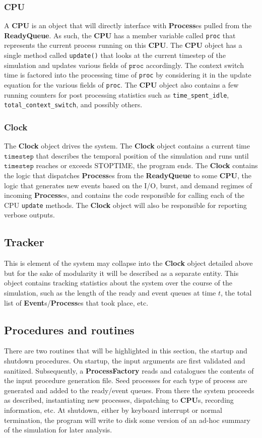 \documentclass{article}
\begin{document}
\subsubsection*{CPU}
A \textbf{CPU} is an object that will directly interface with \textbf{Process}es pulled from the \textbf{ReadyQueue}. As such, the \textbf{CPU}
has a member variable called \texttt{proc} that represents the current process running on this \textbf{CPU}. The \textbf{CPU} object has a single
method called \texttt{update()} that looks at the current timestep of the simulation and updates various fields of $\texttt{proc}$ accordingly.
The context switch time is factored into the processing time of \texttt{proc} by considering it in the update equation for the various fields
of \texttt{proc}.
The \textbf{CPU} object also contains a few running counters for post processing statistics such as \texttt{time\_spent\_idle}, \texttt{total\_context\_switch},
and possibly others.

\subsubsection*{Clock}
The \textbf{Clock} object drives the system. The \textbf{Clock} object contains a current time $\texttt{timestep}$ that describes the temporal
position of the simulation and runs until $\texttt{timestep}$ reaches or exceeds STOPTIME, the program ends. The \textbf{Clock} contains the logic
that dispatches \textbf{Process}es from the \textbf{ReadyQueue} to some \textbf{CPU}, the logic that generates new events based on the I/O, burst, and
demand regimes of incoming \textbf{Process}es, and contains the code responsible for calling each of the CPU \texttt{update} methods. The \textbf{Clock}
object will also be responsible for reporting verbose outputs.
\subsection*{Tracker}
This is element of the system may collapse into the \textbf{Clock} object detailed above but for the sake of modularity it will be described as a separate
entity. This object contains tracking statistics about the system over the course of the simulation, such as the length of the ready and event queues at time $t$,
the total list of \textbf{Event}s/\textbf{Process}es that took place, etc.

\subsection*{Procedures and routines}
There are two routines that will be highlighted in this section, the startup and shutdown procedures. On startup, the input arguments are first validated and sanitized.
Subsequently, a \textbf{ProcessFactory} reads and catalogues the contents of the input procedure generation file. Seed processes for each type of process are generated and
added to the ready/event queues. From there the system proceeds as described, instantiating new processes, dispatching to \textbf{CPU}s, recording information, etc. At shutdown,
either by keyboard interrupt or normal termination, the program will write to disk some version of an ad-hoc summary of the simulation for later analysis. 
\end{document}

